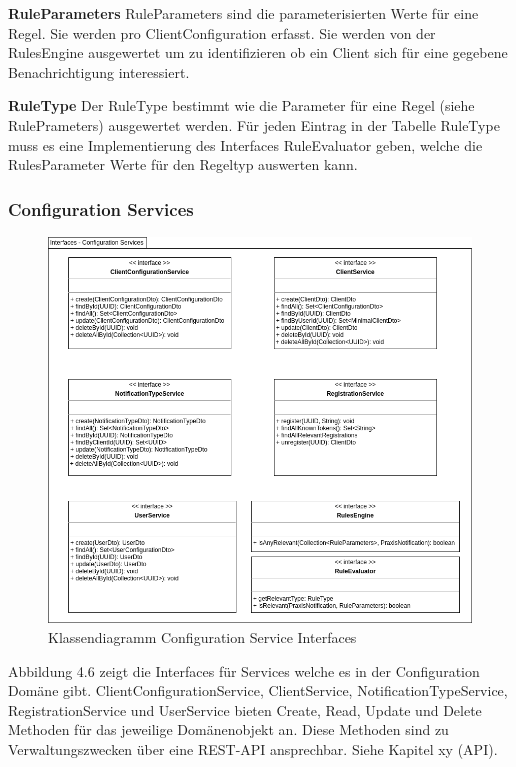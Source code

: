\textbf{RuleParameters}
RuleParameters sind die parameterisierten Werte für eine Regel.
Sie werden pro ClientConfiguration erfasst.
Sie werden von der RulesEngine ausgewertet um zu identifizieren ob ein Client sich für eine gegebene Benachrichtigung interessiert.

\textbf{RuleType}
Der RuleType bestimmt wie die Parameter für eine Regel (siehe RulePrameters) ausgewertet werden.
Für jeden Eintrag in der Tabelle RuleType muss es eine Implementierung des Interfaces RuleEvaluator geben, welche die RulesParameter Werte für den Regeltyp auswerten kann.

\subsubsection*{Configuration Services}

\begin{figure}[h]
    \centering
    \begin{minipage}[b]{0.9\textwidth}
        \includegraphics[width=\textwidth]{graphics/Class_Configuration_Services}
        \caption{Klassendiagramm Configuration Service Interfaces}
    \end{minipage}
\end{figure}

Abbildung 4.6 zeigt die Interfaces für Services welche es in der Configuration Domäne gibt.
ClientConfigurationService, ClientService, NotificationTypeService, RegistrationService und UserService bieten Create, Read, Update und Delete Methoden für das jeweilige Domänenobjekt an.
Diese Methoden sind zu Verwaltungszwecken über eine REST-API ansprechbar. Siehe Kapitel xy (API).

